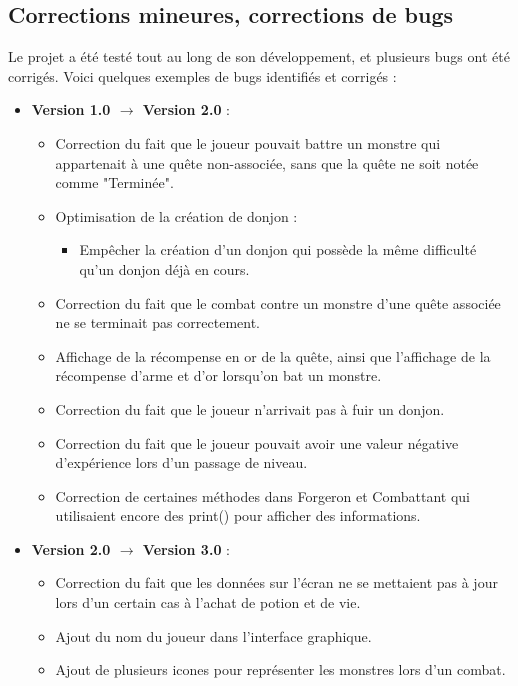 \documentclass{article}
\begin{document}
    
\subsection{Corrections mineures, corrections de bugs}
Le projet a été testé tout au long de son développement, et plusieurs bugs ont été corrigés. Voici quelques exemples de bugs identifiés et corrigés :

\begin{itemize}

  \item \textbf{Version 1.0 $\rightarrow$ Version 2.0} :
  \begin{itemize}
    \item Correction du fait que le joueur pouvait battre un monstre qui appartenait à une quête non-associée, sans que la quête ne soit notée comme "Terminée".
    \item Optimisation de la création de donjon :
    \begin{itemize}
      \item Empêcher la création d'un donjon qui possède la même difficulté qu'un donjon déjà en cours.
    \end{itemize}
    \item Correction du fait que le combat contre un monstre d'une quête associée ne se terminait pas correctement.
    \item Affichage de la récompense en or de la quête, ainsi que l'affichage de la récompense d'arme et d'or lorsqu'on bat un monstre.
    \item Correction du fait que le joueur n'arrivait pas à fuir un donjon.
    \item Correction du fait que le joueur pouvait avoir une valeur négative d'expérience lors d'un passage de niveau.
    \item Correction de certaines méthodes dans Forgeron et Combattant qui utilisaient encore des print() pour afficher des informations.
  \end{itemize}

  \item \textbf{Version 2.0 $\rightarrow$ Version 3.0} :
  \begin{itemize}
    \item Correction du fait que les données sur l'écran ne se mettaient pas à jour lors d'un certain cas à l'achat de potion et de vie.
    \item Ajout du nom du joueur dans l'interface graphique.
    \item Ajout de plusieurs icones pour représenter les monstres lors d'un combat.
  \end{itemize}

\end{itemize}
\end{document}
